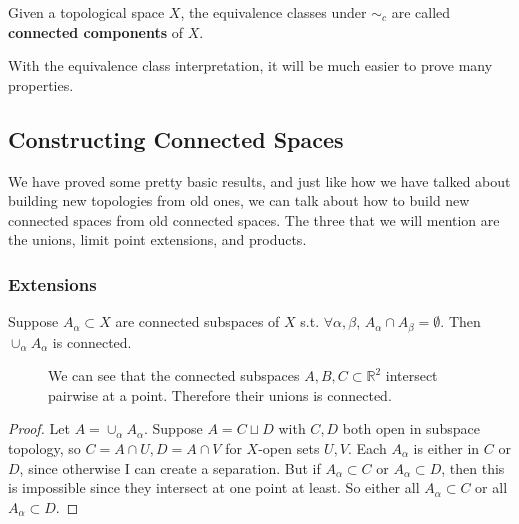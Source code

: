   \begin{definition}
    Given a topological space $X$, the equivalence classes under $\sim_c$ are called \textbf{connected components} of $X$. 
  \end{definition}

  With the equivalence class interpretation, it will be much easier to prove many properties. 

\subsection{Constructing Connected Spaces}

  We have proved some pretty basic results, and just like how we have talked about building new topologies from old ones, we can talk about how to build new connected spaces from old connected spaces. The three that we will mention are the unions, limit point extensions, and products. 

\subsubsection{Extensions}

  \begin{theorem}
    Suppose $A_\alpha \subset X$ are connected subspaces of $X$ s.t. $\forall \alpha, \beta$, $A_\alpha \cap A_\beta = \emptyset$. Then $\cup_\alpha A_\alpha$ is connected. 

  \begin{figure}[H]
    \centering 
    \caption{We can see that the connected subspaces $A, B, C \subset \mathbb{R}^2$ intersect pairwise at a point. Therefore their unions is connected. } 
  \end{figure}

  \end{theorem}
  \begin{proof}
    Let $A = \cup_\alpha A_\alpha$. Suppose $A = C \sqcup D$ with $C, D$ both open in subspace topology, so $C = A \cap U, D = A \cap V$ for $X$-open sets $U, V$. Each $A_\alpha$ is either in $C$ or $D$, since otherwise I can create a separation. But if $A_\alpha \subset C$ or $A_\alpha \subset D$, then this is impossible since they intersect at one point at least. So either all $A_\alpha \subset C$ or all $A_\alpha \subset D$. 
  \end{proof} 

